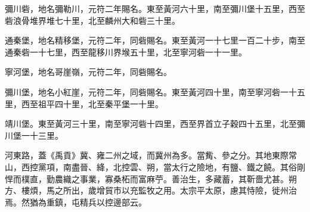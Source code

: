 \begin{pinyinscope}
 彌川砦，地名彌勒川，元符二年賜名。東至黃河六十里，南至彌川堡十五里，西至砦浪骨堆界堆七十里，北至麟州大和砦三十里。



 通秦堡，地名精移堡，元符二年，同砦賜名。東至黃河一十七里一百二十步，南至通秦砦一十七里，西至龍移川界堠五十里，北至寧河砦一十一里。



 寧河堡，地名哥崖嶺，元符二年，同砦賜名。



 彌川堡，地名小紅崖，元符二年，同砦賜名。東至黃河四十里，南至寧河砦一十五里，西至祖平四十里，北至秦平堡一十里。



 靖川堡。東至黃河三十里，南至寧河砦十四里，西至界首立子穀四十五里，北至彌川堡一十三里。



 河東路，蓋《禹貢》冀、雍二州之域，而冀州為多。當觜、參之分。其地東際常山，西控黨項，南盡晉、絳，北控雲、朔，當太行之險地，有鹽、鐵之饒。其俗剛悍而樸直，勤農織之事業，寡桑柘而富麻苧。善治生，多藏蓄，其靳嗇尤甚。朔方、樓煩，馬之所出，歲增貿市以充監牧之用。太宗平太原，慮其恃險，徙州治焉。然猶為重鎮，屯精兵以控邊部云。



\end{pinyinscope}